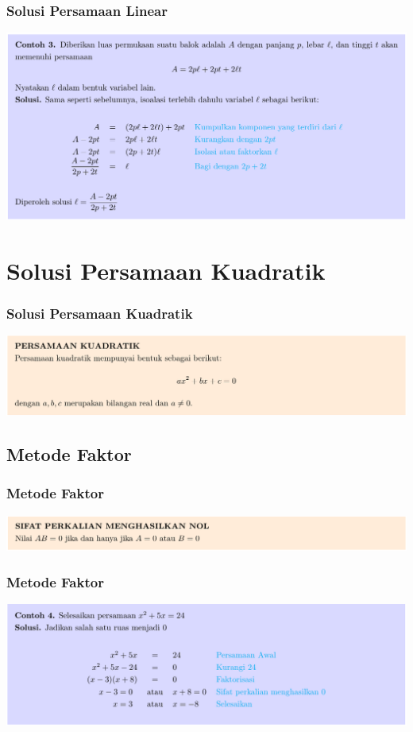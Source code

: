 \documentclass[pdflatex,compress,mathserif]{beamer}
\begin{document}
\begin{frame}
	\frametitle{Solusi Persamaan Linear}
	\begin{center}
		\includegraphics[width=\linewidth]{img/img06}
	\end{center}
\end{frame}

\section{Solusi Persamaan Kuadratik}

\begin{frame}
	\frametitle{Solusi Persamaan Kuadratik}
	\begin{center}
		\includegraphics[width=\linewidth]{img/img07}
	\end{center}
\end{frame}

\subsection{Metode Faktor}

\begin{frame}
	\frametitle{Metode Faktor}
	\begin{center}
		\includegraphics[width=\linewidth]{img/img08}
	\end{center}
\end{frame}

\begin{frame}
	\frametitle{Metode Faktor}
	\begin{center}
		\includegraphics[width=\linewidth]{img/img09}
	\end{center}
\end{frame}
\end{document}
